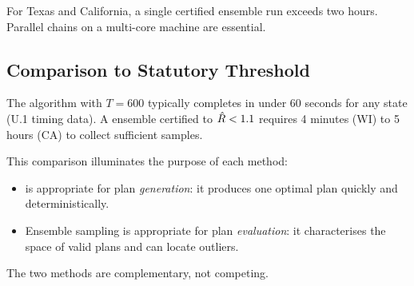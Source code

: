 For Texas and California, a single certified ensemble run exceeds two hours.
Parallel chains on a multi-core machine are essential.

\subsection{Comparison to Statutory Threshold}

The \cs{} algorithm with $T = 600$ typically completes in under 60 seconds
for any state (U.1 timing data).
A \recom{} ensemble certified to $\hat{R} < 1.1$ requires 4 minutes (WI) to
5 hours (CA) to collect sufficient samples.

This comparison illuminates the purpose of each method:
\begin{itemize}
\item \cs{} is appropriate for plan \emph{generation}: it produces one
      optimal plan quickly and deterministically.
\item Ensemble sampling is appropriate for plan \emph{evaluation}: it
      characterises the space of valid plans and can locate outliers.
\end{itemize}

The two methods are complementary, not competing.
